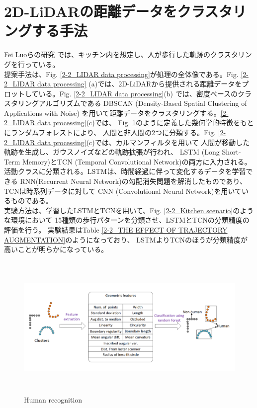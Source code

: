 \section{2D-LiDARの距離データをクラスタリングする手法}
Fei Luoらの研究\cite{Temporal convolutional networks for multi-person activity recognition using a 2D LIDAR}
では、キッチン内を想定し、人が歩行した軌跡のクラスタリングを行っている。\\ \indent
提案手法は、Fig. \ref{2-2_LIDAR data processing}が処理の全体像である。Fig. \ref{2-2_LIDAR data processing}
(a)では、2D-LiDARから提供される距離データをプロットしている。Fig. \ref{2-2_LIDAR data processing}(b)
では、密度ベースのクラスタリングアルゴリズムである
DBSCAN (Density-Based Spatial Clustering of Applications with Noise)
を用いて距離データをクラスタリングする。\ref{2-2_LIDAR data processing}(c)では、
Fig. \ref{2-2_Human recognition}のように定義した幾何学的特徴をもとにランダムフォレストにより、
人間と非人間の2つに分類する。Fig. \ref{2-2_LIDAR data processing}(c)では、カルマンフィルタを用いて
人間が移動した軌跡を生成し、ガウスノイズなどの軌跡拡張が行われ、
LSTM (Long Short-Term Memory)とTCN (Temporal Convolutional Network)の両方に入力される。
活動クラスに分類される。LSTMは、時間経過に伴って変化するデータを学習できる
RNN(Recurrent Neural Network)の勾配消失問題を解消したものであり、TCNは時系列データに対して
CNN (Convolutional Neural Network)を用いているものである。\\ \indent
実験方法は、学習したLSTMとTCNを用いて、Fig. \ref{2-2_Kitchen scenario}のような環境において
15種類の歩行パターンを分類させ、LSTMとTCNの分類精度の評価を行う。
実験結果はTable \ref{2-2_THE EFFECT OF TRAJECTORY AUGMENTATION}のようになっており、
LSTMよりTCNのほうが分類精度が高いことが明らかになっている。

\begin{figure}[h]
  \begin{center}
  \includegraphics[height=70mm,clip]{figure/2-2_Human-recognition.png}
  \caption{Human recognition\cite{Temporal convolutional networks for multi-person activity recognition using a 2D LIDAR}}
  \label{2-2_Human recognition}
  \end{center}
\end{figure}

